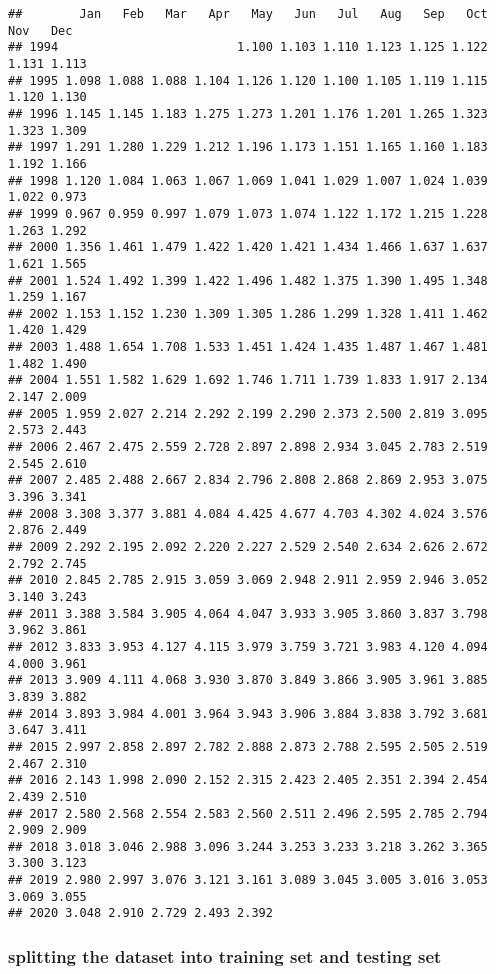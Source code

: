 \documentclass[
]{article}
\begin{document}
\begin{verbatim}
##        Jan   Feb   Mar   Apr   May   Jun   Jul   Aug   Sep   Oct   Nov   Dec
## 1994                         1.100 1.103 1.110 1.123 1.125 1.122 1.131 1.113
## 1995 1.098 1.088 1.088 1.104 1.126 1.120 1.100 1.105 1.119 1.115 1.120 1.130
## 1996 1.145 1.145 1.183 1.275 1.273 1.201 1.176 1.201 1.265 1.323 1.323 1.309
## 1997 1.291 1.280 1.229 1.212 1.196 1.173 1.151 1.165 1.160 1.183 1.192 1.166
## 1998 1.120 1.084 1.063 1.067 1.069 1.041 1.029 1.007 1.024 1.039 1.022 0.973
## 1999 0.967 0.959 0.997 1.079 1.073 1.074 1.122 1.172 1.215 1.228 1.263 1.292
## 2000 1.356 1.461 1.479 1.422 1.420 1.421 1.434 1.466 1.637 1.637 1.621 1.565
## 2001 1.524 1.492 1.399 1.422 1.496 1.482 1.375 1.390 1.495 1.348 1.259 1.167
## 2002 1.153 1.152 1.230 1.309 1.305 1.286 1.299 1.328 1.411 1.462 1.420 1.429
## 2003 1.488 1.654 1.708 1.533 1.451 1.424 1.435 1.487 1.467 1.481 1.482 1.490
## 2004 1.551 1.582 1.629 1.692 1.746 1.711 1.739 1.833 1.917 2.134 2.147 2.009
## 2005 1.959 2.027 2.214 2.292 2.199 2.290 2.373 2.500 2.819 3.095 2.573 2.443
## 2006 2.467 2.475 2.559 2.728 2.897 2.898 2.934 3.045 2.783 2.519 2.545 2.610
## 2007 2.485 2.488 2.667 2.834 2.796 2.808 2.868 2.869 2.953 3.075 3.396 3.341
## 2008 3.308 3.377 3.881 4.084 4.425 4.677 4.703 4.302 4.024 3.576 2.876 2.449
## 2009 2.292 2.195 2.092 2.220 2.227 2.529 2.540 2.634 2.626 2.672 2.792 2.745
## 2010 2.845 2.785 2.915 3.059 3.069 2.948 2.911 2.959 2.946 3.052 3.140 3.243
## 2011 3.388 3.584 3.905 4.064 4.047 3.933 3.905 3.860 3.837 3.798 3.962 3.861
## 2012 3.833 3.953 4.127 4.115 3.979 3.759 3.721 3.983 4.120 4.094 4.000 3.961
## 2013 3.909 4.111 4.068 3.930 3.870 3.849 3.866 3.905 3.961 3.885 3.839 3.882
## 2014 3.893 3.984 4.001 3.964 3.943 3.906 3.884 3.838 3.792 3.681 3.647 3.411
## 2015 2.997 2.858 2.897 2.782 2.888 2.873 2.788 2.595 2.505 2.519 2.467 2.310
## 2016 2.143 1.998 2.090 2.152 2.315 2.423 2.405 2.351 2.394 2.454 2.439 2.510
## 2017 2.580 2.568 2.554 2.583 2.560 2.511 2.496 2.595 2.785 2.794 2.909 2.909
## 2018 3.018 3.046 2.988 3.096 3.244 3.253 3.233 3.218 3.262 3.365 3.300 3.123
## 2019 2.980 2.997 3.076 3.121 3.161 3.089 3.045 3.005 3.016 3.053 3.069 3.055
## 2020 3.048 2.910 2.729 2.493 2.392
\end{verbatim}

\hypertarget{splitting-the-dataset-into-training-set-and-testing-set}{%
\subsubsection{splitting the dataset into training set and testing
set}\label{splitting-the-dataset-into-training-set-and-testing-set}}
\end{document}
